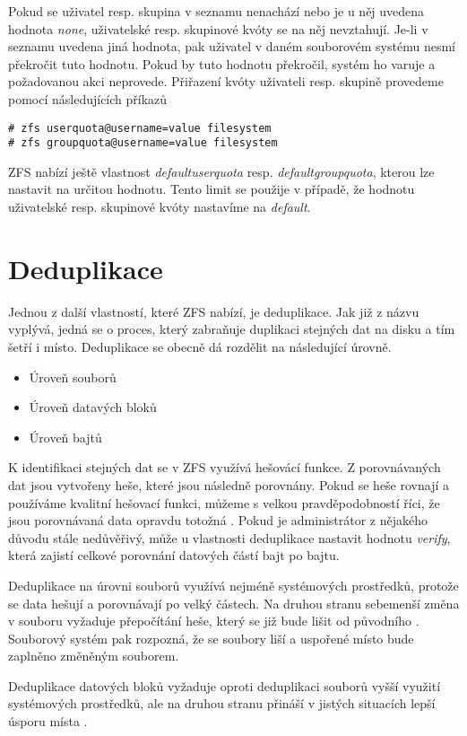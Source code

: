 Pokud se uživatel resp. skupina v seznamu nenachází nebo je u něj uvedena hodnota \emph{none}, uživatelské resp. skupinové kvóty se na něj nevztahují. Je-li v seznamu uvedena jiná hodnota, pak uživatel v daném souborovém systému nesmí překročit tuto hodnotu. Pokud by tuto hodnotu překročil, systém ho varuje a požadovanou akci neprovede. Přiřazení kvóty uživateli resp. skupině provedeme pomocí následujících příkazů
\begin{verbatim}
# zfs userquota@username=value filesystem
# zfs groupquota@username=value filesystem
\end{verbatim}

ZFS nabízí ještě vlastnost \emph{defaultuserquota} resp. \emph{defaultgroupquota}, kterou lze nastavit na určitou hodnotu. Tento limit se použije v případě, že hodnotu uživatelské resp. skupinové kvóty nastavíme na \emph{default}.
\section{Deduplikace}
\label{dedup}
Jednou z další vlastností, které ZFS nabízí, je deduplikace. Jak již z názvu vyplývá, jedná se o proces, který zabraňuje duplikaci stejných dat na disku a tím šetří i místo. Deduplikace se obecně dá rozdělit na následující úrovně.
\begin{itemize}
  \item Úroveň souborů
  \item Úroveň datavých bloků
  \item Úroveň bajtů
\end{itemize}

K identifikaci stejných dat se v ZFS využívá hešovácí funkce. Z porovnávaných dat jsou vytvořeny heše, které jsou následně porovnány. Pokud se heše rovnají a používáme kvalitní hešovací funkci, můžeme s velkou pravděpodobností říci, že jsou porovnávaná data opravdu totožná \cite{dedup}. Pokud je administrátor z nějakého důvodu stále nedůvěřivý, může u vlastnosti deduplikace nastavit hodnotu \emph{verify}, která zajistí celkové porovnání datových částí bajt po bajtu.

Deduplikace na úrovni souborů využívá nejméně systémových prostředků, protože se data hešují a porovnávají po velký částech. Na druhou stranu sebemenší změna v souboru vyžaduje přepočítání heše, který se již bude lišit od původního \cite{dedup}. Souborový systém pak rozpozná, že se soubory liší a uspořené místo bude zaplněno změněným souborem.

Deduplikace datových bloků vyžaduje oproti deduplikaci souborů vyšší využití systémových prostředků, ale na druhou stranu přináší v jistých situacích lepší úsporu místa \cite{dedup}.

